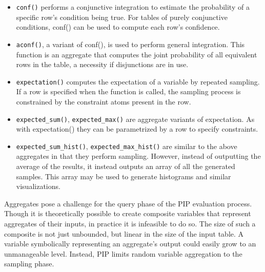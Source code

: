 \begin{itemize}
\footnotesize
\item \texttt{conf()} performs a conjunctive integration to estimate the probability of a specific row's condition being true.  For tables of purely conjunctive conditions, conf() can be used to compute each row's confidence. 

\item \texttt{aconf()}, a variant of conf(), is used to perform general integration.  This function is an aggregate that computes the joint probability of all equivalent rows in the table, a necessity if disjunctions are in use.  

\item \texttt{expectation()} computes the expectation of a variable by repeated sampling.  If a row is specified when the function is called, the sampling process is constrained by the constraint atoms present in the row.

\item \texttt{expected\_sum()}, \texttt{expected\_max()} are aggregate variants of expectation.  As with expectation() they can be parametrized by a row to specify constraints.

\item \texttt{expected\_sum\_hist()}, \texttt{expected\_max\_hist()} are similar to the above aggregates in that they perform sampling.  However, instead of outputting the average of the results, it instead outputs an array of all the generated samples.  This array may be used to generate histograms and similar visualizations.
\end{itemize}

Aggregates pose a challenge for the query phase of the PIP evaluation process.  Though it is theoretically possible to create composite variables that represent aggregates of their inputs, in practice it is infeasible to do so.  The size of such a composite is not just unbounded, but linear in the size of the input table.  A variable symbolically representing an aggregate's output could easily grow to an unmanageable level.  Instead, PIP limits random variable aggregation to the sampling phase.  



